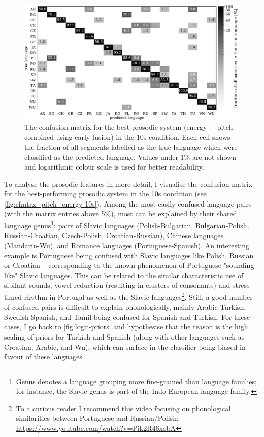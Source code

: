 \documentclass[bsc,frontabs,twoside,singlespacing,parskip,deptreport]{infthesis}
\begin{document}
{{    \begin{figure}[h!t]
      \centering
      \includegraphics[width=\textwidth]{../img/cfmtrx_pitch_energy.pdf}
      \caption{The confusion matrix for the best prosodic system (energy + pitch combined using early fusion) in the 10s condition. Each cell shows the fraction of all segments labelled as the true language which were classified as the predicted language. Values under 1\% are not shown and logarithmic colour scale is used for better readability.}
      \label{fig:cfmtrx_pitch_energy-10s}
    \end{figure}

    To analyse the prosodic features in more detail, I visualise the confusion matrix for the best-performing prosodic system in the 10s condition (see \autoref{fig:cfmtrx_pitch_energy-10s}). Among the most easily confused language pairs (with the matrix entries above 5\%), most can be explained by their shared language genus\footnote{Genus denotes a language grouping more fine-grained than language families; for instance, the Slavic genus is part of the Indo-European language family.}: pairs of Slavic languages (Polish-Bulgarian, Bulgarian-Polish, Russian-Croatian, Czech-Polish, Croatian-Russian), Chinese languages (Mandarin-Wu), and Romance languages (Portuguese-Spanish). An interesting example is Portuguese being confused with Slavic languages like Polish, Russian or Croatian -- corresponding to the known phenomenon of Portuguese "sounding like" Slavic languages. This can be related to the similar characteristic use of sibilant sounds, vowel reduction (resulting in clusters of consonants) and stress-timed rhythm in Portugal as well as the Slavic languages\footnote{To a curious reader I recommend this video focusing on phonological similarities between Portuguese and Russian/Polish: \url{https://www.youtube.com/watch?v=Pik2R46xobA}}. Still, a good number of confused pairs is difficult to explain phonologically, mainly Arabic-Turkish, Swedish-Spanish, and Tamil being confused for Spanish and Turkish. For these cases, I go back to \autoref{fig:logit-priors} and hypothesise that the reason is the high scaling of priors for Turkish and Spanish (along with other languages such as Croatian, Arabic, and Wu), which can surface in the classifier being biased in favour of these languages.

}}
\end{document}
